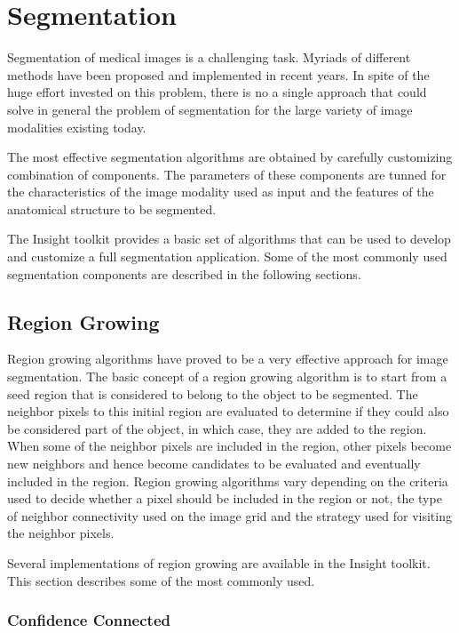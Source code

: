 
\chapter{Segmentation}

Segmentation of medical images is a challenging task. Myriads of different
methods have been proposed and implemented in recent years. In spite of the
huge effort invested on this problem, there is no a single approach that could
solve in general the problem of segmentation for the large variety of image
modalities existing today.

The most effective segmentation algorithms are obtained by carefully
customizing combination of components. The parameters of these components are
tunned for the characteristics of the image modality used as input and the
features of the anatomical structure to be segmented. 

The Insight toolkit provides a basic set of algorithms that can be used to
develop and customize a full segmentation application. Some of the most
commonly used segmentation components are described in the following sections.


\section{Region Growing}

Region growing algorithms have proved to be a very effective approach for image
segmentation. The basic concept of a region growing algorithm is to start from
a seed region that is considered to belong to the object to be segmented. The
neighbor pixels to this initial region are evaluated to determine if they could
also be considered part of the object, in which case, they are added to the
region. When some of the neighbor pixels are included in the region, other
pixels become new neighbors and hence become candidates to be evaluated and
eventually included in the region. Region growing algorithms vary depending on
the criteria used to decide whether a pixel should be included in the region
or not, the type of neighbor connectivity used on the image grid and the
strategy used for visiting the neighbor pixels.

Several implementations of region growing are available in the
Insight toolkit. This section describes some of the most commonly used.

\subsection{Confidence Connected}
\label{sec:ConfidenceConnected}


